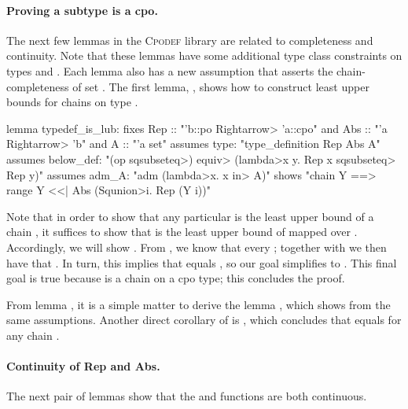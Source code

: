 \paragraph{Proving a subtype is a cpo.} The next few lemmas in the \textsc{Cpodef} library are related to completeness and continuity. Note that these lemmas have some additional type class constraints on types  and . Each lemma also has a new assumption  that asserts the chain-completeness of set . The first lemma, , shows how to construct least upper bounds for chains on type .

\begin{isacode}
lemma typedef_is_lub:
  fixes Rep :: "'b::po \<Rightarrow> 'a::cpo" and Abs :: "'a \<Rightarrow> 'b" and A :: "'a set"
  assumes type: "type_definition Rep Abs A"
  assumes below_def: "(op \<sqsubseteq>) \<equiv> (\<lambda>x y. Rep x \<sqsubseteq> Rep y)"
  assumes adm_A: "adm (\<lambda>x. x \<in> A)"
  shows "chain Y ==> range Y <<| Abs (\<Squnion>i. Rep (Y i))"
\end{isacode}

\noindent
Note that in order to show that any particular  is the least upper bound of a chain , it suffices to show that  is the least upper bound of  mapped over . Accordingly, we will show . From , we know that every ; together with  we then have that . In turn, this implies that  equals , so our goal simplifies to . This final goal is true because  is a chain on a cpo type; this concludes the proof.

From lemma , it is a simple matter to derive the lemma , which shows  from the same assumptions. Another direct corollary of  is , which concludes that  equals  for any chain .

\paragraph{Continuity of Rep and Abs.} The next pair of lemmas show that the  and  functions are both continuous.

